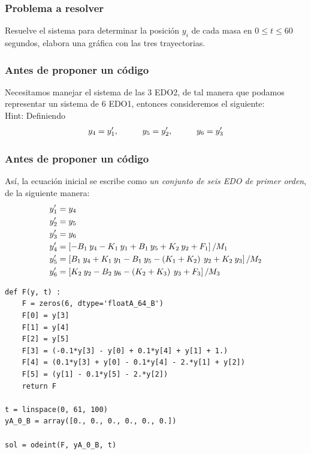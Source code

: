\begin{frame}
\frametitle{Problema a resolver}
Resuelve el sistema para determinar la posición $y_{i}$ de cada masa en $0 \leq t \leq 60$ segundos, elabora una gráfica con las tres trayectorias.
\end{frame}
\begin{frame}
\frametitle{Antes de proponer un código}
Necesitamos manejar el sistema de las $3$ EDO2, de tal manera que podamos representar un sistema de $6$ EDO1, entonces consideremos el siguiente:
\\
\bigskip
Hint: Definiendo
\begin{align*}
y_{4} = {y}^{\prime}_{1}, \hspace{1cm} y_{5} = {y}^{\prime}_{2}, \hspace{1cm} y_{6} = {y}^{\prime}_{3}
\end{align*}
\end{frame}
\begin{frame}
\frametitle{Antes de proponer un código}
Así, la ecuación inicial se escribe como \emph{un conjunto de seis EDO de primer orden}, de la siguiente manera:
\fontsize{12}{12}\selectfont
\begin{align*}
{y}^{\prime}_{1} &= y_{4} \\
{y}^{\prime}_{2} &= y_{5} \\
{y}^{\prime}_{3} &= y_{6} \\
{y}^{\prime}_{4} &= \left[ -B_{1} \: y_{4} - K_{1} \: y_{1} + B_{1} \: y_{5} + K_{2} \: y_{2} + F_{1} \right] / M_{1} \\
{y}^{\prime}_{5} &= \left[ B_{1} \: y_{4} + K_{1} \: y_{1} - B_{1} \: y_{5} - \left( K_{1} + K_{2} \right) \: y_{2} + K_{2} \: y_{3} \right] / M_{2}\\
{y}^{\prime}_{6} &= \left[ K_{2} \: y_{2} - B_{2} \: y_{6} - \left( K_{2} + K_{3} \right) \: y_{3} + F_{3} \right] / M_{3}
\end{align*}
\end{frame}
\begin{frame}
\begin{lstlisting}[caption=Código para el sistema de masas, style=codigopython]
def F(y, t) : 
    F = zeros(6, dtype='floatA_64_B')
    F[0] = y[3]
    F[1] = y[4]
    F[2] = y[5]
    F[3] = (-0.1*y[3] - y[0] + 0.1*y[4] + y[1] + 1.)
    F[4] = (0.1*y[3] + y[0] - 0.1*y[4] - 2.*y[1] + y[2])
    F[5] = (y[1] - 0.1*y[5] - 2.*y[2])
    return F

t = linspace(0, 61, 100)
yA_0_B = array([0., 0., 0., 0., 0., 0.])

sol = odeint(F, yA_0_B, t)
\end{lstlisting}
\end{frame}
